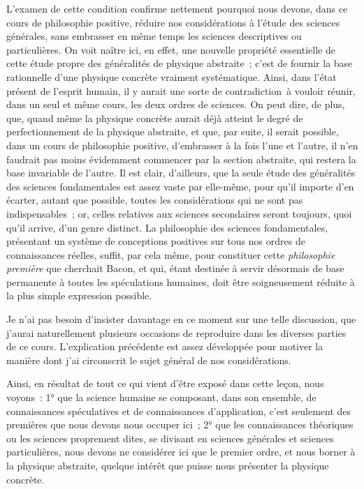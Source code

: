 \documentclass[french,twoside]{book} %
\begin{document}
L’examen de cette condition confirme nettement pourquoi nous devons, dans ce cours de philosophie positive, réduire nos considérations à l’étude des sciences générales, sans embrasser en même temps les sciences descriptives ou particulières. On voit naître ici, en effet, une nouvelle propriété essentielle de cette étude propre des généralités de physique abstraite ; c’est de fournir la base rationnelle d’une physique concrète vraiment systématique. Ainsi, dans l’état présent de l’esprit humain, il y aurait une sorte de contradiction à vouloir réunir, dans un seul et même cours, les deux ordres de sciences. On peut dire, de plus, que, quand même la physique concrète aurait déjà atteint le degré de perfectionnement de la physique abstraite, et que, par suite, il serait possible, dans un cours de philosophie positive, d’embrasser à la fois l’une et l’autre, il n’en faudrait pas moins évidemment commencer par la section abstraite, qui restera la base invariable de l’autre. Il est clair, d’ailleurs, que la seule étude des généralités des sciences fondamentales est assez vaste par elle-même, pour qu’il importe d’en écarter, autant que possible, toutes les considérations qui ne sont pas indispensables ; or, celles relatives aux sciences secondaires seront toujours, quoi qu’il arrive, d’un genre distinct. La philosophie des sciences fondamentales, présentant un système de conceptions positives sur tous nos ordres de connaissances réelles, suffit, par cela même, pour constituer cette {\itshape philosophie première} que cherchait Bacon, et qui, étant destinée à servir désormais de base permanente à toutes les spéculations humaines, doit être soigneusement réduite à la plus simple expression possible.\par
Je n’ai pas besoin d’insister davantage en ce moment sur une telle discussion, que j’aurai naturellement plusieurs occasions de reproduire dans les diverses parties de ce cours. L’explication précédente est assez développée pour motiver la manière dont j’ai circonscrit le sujet général de nos considérations.\par
Ainsi, en résultat de tout ce qui vient d’être exposé dans cette leçon, nous voyons : 1° que la science humaine se composant, dans son ensemble, de connaissances spéculatives et de connaissances d’application, c’est seulement des premières que nous devons nous occuper ici ; 2° que les connaissances théoriques ou les sciences proprement dites, se divisant en sciences générales et sciences particulières, nous devons ne considérer ici que le premier ordre, et nous borner à la physique abstraite, quelque intérêt que puisse nous présenter la physique concrète.
\end{document}

